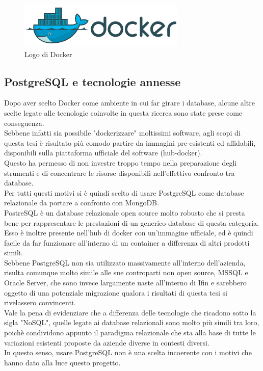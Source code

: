 \begin{figure}[htbp]
\begin{center}
\includegraphics[height=6em]{immagini/tecnologies-logos/Docker-Logo.png}
\caption{Logo di Docker}
\end{center}
\end{figure}

\subsection{PostgreSQL e tecnologie annesse}
Dopo aver scelto Docker come ambiente in cui far girare i database, alcune altre scelte legate alle tecnologie coinvolte in questa ricerca sono state prese come conseguenza.\\
Sebbene infatti sia possibile "dockerizzare" moltissimi software, agli scopi di questa tesi è risultato più comodo partire da immagini pre-esistenti ed affidabili, disponibili sulla piattaforma ufficiale del software (hub-docker).\\
Questo ha permesso di non investre troppo tempo nella preparazione degli strumenti e di concentrare le risorse disponibili nell'effettivo confronto tra database.\\

\noindent Per tutti questi motivi si è quindi scelto di usare PostgreSQL come database relazionale da portare a confronto con MongoDB.\\
PostreSQL è un database relazionale open source molto robusto che si presta bene per rappresentare le prestazioni di un generico database di questa categoria. Esso è inoltre presente nell'hub di docker con un'immagine ufficiale, ed è quindi facile da far funzionare all'interno di un container a differenza di altri prodotti simili.\\
Sebbene PostgreSQL non sia utilizzato massivamente all'interno dell'azienda, risulta comunque molto simile alle sue controparti non open source, MSSQL e Oracle Server, che sono invece largamente uaste all'interno di Ifin e sarebbero oggetto di una potenziale migrazione qualora i risultati di questa tesi si rivelassero convincenti.\\

\noindent Vale la pena di evidenziare che a differenza delle tecnologie che ricadono sotto la sigla "NoSQL", quelle legate ai database relazionali sono molto più simili tra loro, poichè condividono appunto il paradigma relazionale che sta alla base di tutte le variazioni esistenti proposte da aziende diverse in contesti diversi.\\
In questo senso, usare PostgreSQL non è una scelta incoerente con i motivi che hanno dato alla luce questo progetto.

